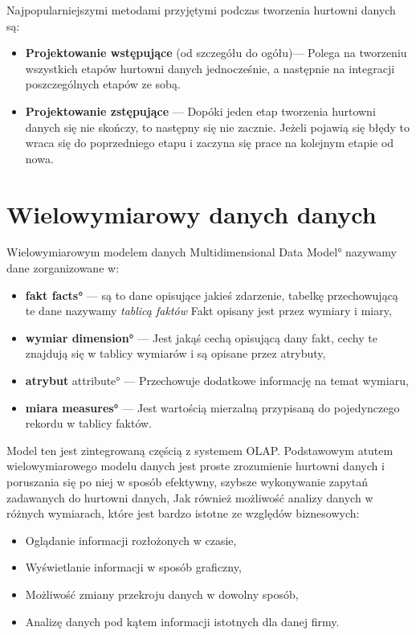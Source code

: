 Najpopularniejszymi metodami przyjętymi podczas tworzenia hurtowni danych są:
\begin{itemize}
 \item \textbf{Projektowanie wstępujące} (od szczegółu do ogółu)---
    Polega na tworzeniu wszystkich etapów hurtowni danych
    jednocześnie, a następnie na integracji poszczególnych etapów ze sobą.
 \item \textbf{Projektowanie zstępujące} ---
    Dopóki jeden etap tworzenia hurtowni danych się nie skończy, 
     to następny się nie zacznie.
    Jeżeli pojawią się błędy to wraca się do poprzedniego etapu i zaczyna się prace 
     na kolejnym etapie od nowa.
\end{itemize}



\section{Wielowymiarowy danych danych}
Wielowymiarowym modelem danych \ang{Multidimensional Data Model} 
nazywamy dane zorganizowane w:
\begin{itemize}
 \item \textbf{fakt \ang{facts}  } --- 
    są to dane opisujące jakieś zdarzenie, 
    tabelkę przechowującą te dane nazywamy  \textit{tablicą faktów} 
   Fakt opisany jest przez wymiary i miary,
 \item \textbf{wymiar \ang{dimension}} --- 
    Jest jakąś cechą opisującą dany fakt, cechy te znajdują się w tablicy wymiarów i są opisane przez atrybuty,
 \item \textbf{atrybut} \ang{ attribute}  --- 
    Przechowuje dodatkowe informację na temat wymiaru,
 \item \textbf{miara \ang{measures}} --- 
    Jest wartością mierzalną przypisaną do pojedynczego rekordu w tablicy faktów. 
\end{itemize}

Model ten jest zintegrowaną częścią z systemem OLAP.
Podstawowym atutem wielowymiarowego modelu danych jest proste zrozumienie hurtowni danych 
 i poruszania się po niej w sposób efektywny, szybsze wykonywanie zapytań zadawanych do hurtowni danych, 
Jak również możliwość analizy danych w różnych wymiarach, 
które jest bardzo istotne ze względów biznesowych:
\begin{itemize}
 \item Oglądanie informacji rozłożonych w czasie,
 \item Wyświetlanie informacji w sposób graficzny,
 \item Możliwość zmiany przekroju danych w dowolny sposób,
 \item Analizę danych pod kątem informacji istotnych dla danej firmy.
\end{itemize}

